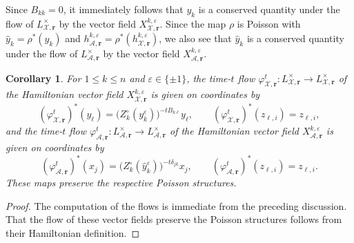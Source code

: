 \documentclass{amsart}
\newtheorem{corollary}[theorem]{Corollary}
\numberwithin{equation}{section}
\newcommand{\bfr}{{\boldsymbol{r}}}
\newcommand{\cA}{\mathcal{A}}
\newcommand{\cX}{\mathcal{X}}
\begin{document}
Since $B_{kk}=0$, it immediately follows that $y_k$ is a conserved quantity under the flow of $L^\times_{\cX,\bfr}$ by the vector field $X_{\cX,\bfr}^{k,\varepsilon}$.
Since the map $\rho$ is Poisson with $\hat y_k=\rho^*(y_k)$ and $h_{\cA,\bfr}^{k,\varepsilon}=\rho^*(h_{\cX,\bfr}^{k,\varepsilon})$, we also see that $\hat y_k$ is a conserved quantity under the flow of $L^\times_{\cA,\bfr}$ by the vector field $X_{\cA,\bfr}^{k,\varepsilon}$.
\begin{corollary}
  \label{cor:time-one flows}
  For $1\le k\le n$ and $\varepsilon\in\{\pm1\}$, the time-$t$ flow $\varphi_{\cX,\bfr}^t:L^\times_{\cX,\bfr}\to L^\times_{\cX,\bfr}$ of the Hamiltonian vector field $X_{\cX,\bfr}^{k,\varepsilon}$ is given on coordinates by
  \[(\varphi_{\cX,\bfr}^t)^*(y_\ell)=\big(Z_k^\circ(y_k^\varepsilon)\big)^{-tB_{k\ell}}y_\ell,\qquad (\varphi_{\cX,\bfr}^t)^*(z_{\ell,i})=z_{\ell,i},\]
  and the time-$t$ flow $\varphi_{\cA,\bfr}^t:L^\times_{\cA,\bfr}\to L^\times_{\cA,\bfr}$ of the Hamiltonian vector field $X_{\cA,\bfr}^{k,\varepsilon}$ is given on coordinates by
  \[(\varphi_{\cA,\bfr}^t)^*(x_j)=\big(Z_k^\circ(\hat y_k^\varepsilon)\big)^{-t\delta_{jk}}x_j,\qquad (\varphi_{\cA,\bfr}^t)^*(z_{\ell,i})=z_{\ell,i}.\]
  These maps preserve the respective Poisson structures.
\end{corollary}
\begin{proof}
  The computation of the flows is immediate from the preceding discussion.
  That the flow of these vector fields preserve the Poisson structures follows from their Hamiltonian definition.
\end{proof}
\end{document}

